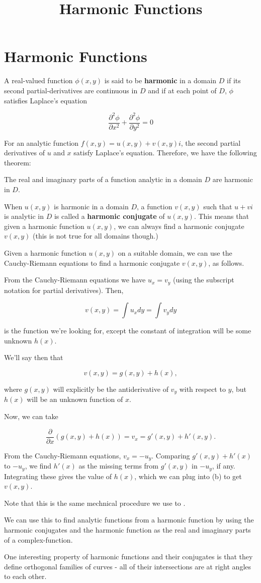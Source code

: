 \documentclass{article}
\title{Harmonic Functions}
\begin{document}
\section{Harmonic Functions}

A real-valued function $\phi(x, y)$ is said to be \textbf{harmonic} in a \@{domain} $D$ if its second \@{partial-derivatives} are \@{continuous} in $D$ and if at each point of $D$, $\phi$ satisfies Laplace's equation

\[ \frac{\partial^2 \phi}{\partial x^2} + \frac{\partial^2 \phi}{\partial y^2} = 0 \]

For an \@{analytic} function $f(x,y) = u(x,y) + v(x,y)i$, the second partial derivatives of $u$ and $x$ satisfy Laplace's equation. Therefore, we have the following theorem:

The real and imaginary parts of a function analytic in a domain $D$ are harmonic in $D$.

When $u(x,y)$ is harmonic in a domain $D$, a function $v(x,y)$ such that $u + vi$ is analytic in $D$ is called a \textbf{harmonic conjugate} of $u(x,y)$. This means that given a harmonic function $u(x,y)$, we can always find a harmonic conjugate $v(x,y)$ (this is not true for all domains though.)

Given a harmonic function $u(x,y)$ on a suitable domain, we can use the Cauchy-Riemann equations to find a harmonic conjugate $v(x,y)$, as follows.

From the Cauchy-Riemann equations we have $u_x = v_y$ (using the subscript notation for partial derivatives). Then,

\[ v(x,y) = \int{u_x}dy = \int{v_y}dy \tag{a} \]

is the function we're looking for, except the constant of integration will be some unknown $h(x)$.

We'll say then that

\[ v(x,y) = g(x,y) + h(x), \tag{b} \]

where $g(x,y)$ will explicitly be the antiderivative of $v_y$ with respect to $y$, but $h(x)$ will be an unknown function of $x$.

Now, we can take

\[ \frac{\partial}{\partial x}(g(x,y) + h(x)) = v_x = g'(x,y) + h'(x,y). \tag{c} \]

From the Cauchy-Riemann equations, $v_x = -u_y$. Comparing $g'(x,y) + h'(x)$ to $-u_y$, we find $h'(x)$ as the missing terms from $g'(x,y)$ in $-u_y$, if any. Integrating these gives the value of $h(x)$, which we can plug into (b) to get $v(x,y)$.

Note that this is the same mechnical procedure we use to .

We can use this to find analytic functions from a harmonic function by using the harmonic conjugates and the harmonic function as the real and imaginary parts of a \@{complex-function}.

One interesting property of harmonic functions and their conjugates is that they define \@{orthogonal} families of curves - all of their intersections are at right angles to each other.
\end{document}
